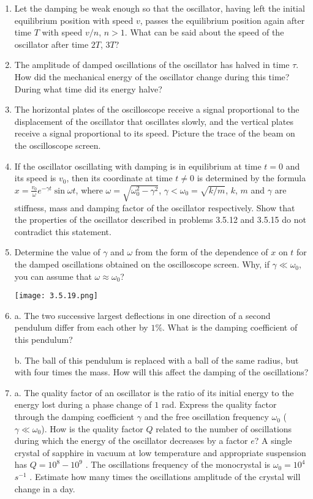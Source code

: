 \documentclass{article}
\begin{document}
\begin{enumerate}[label=3.5.\arabic*]
\item Let the damping be weak enough so that the oscillator, having left the initial equilibrium position with speed $v$, passes the equilibrium position again after time $T$ with speed $v/n$, $n > 1$. What can be said about the speed of the oscillator after time $2 T$, $3 T$?

\item The amplitude of damped oscillations of the oscillator has halved in time $\tau$. How did the mechanical energy of the oscillator change during this time? During what time did its energy halve?

\item The horizontal plates of the oscilloscope receive a signal proportional to the displacement of the oscillator that oscillates slowly, and the vertical plates receive a signal proportional to its speed. Picture the trace of the beam on the oscilloscope screen.

\item If the oscillator oscillating with damping is in equilibrium at time $t = 0$ and its speed is $v_0$, then its coordinate at time $t \neq 0$ is determined by the formula $x = \frac{v_0}{\omega} e^{- \gamma t} \sin{\omega t}$, where $\omega = \sqrt{\omega_0^2 - \gamma^2}$, $\gamma < \omega_0 = \sqrt{k/m}$, $k$, $m$ and $\gamma$ are stiffness, mass and damping factor of the oscillator respectively. Show that the properties of the oscillator described in problems 3.5.12 and 3.5.15 do not contradict this statement.

\item Determine the value of $\gamma$ and $\omega$ from the form of the dependence of $x$ on $t$ for the damped oscillations obtained on the oscilloscope screen. Why, if $\gamma \ll \omega_0$, you can assume that $\omega \approx \omega_0$?

\begin{center}
    \texttt{[image: 3.5.19.png]}
\end{center}

\item a. The two successive largest deflections in one direction of a second pendulum differ from each other by $1\%$. What is the damping coefficient of this pendulum?

b. The ball of this pendulum is replaced with a ball of the same radius, but with four times the mass. How will this affect the damping of the oscillations?

\item a. The quality factor of an oscillator is the ratio of its initial energy to the energy lost during a phase change of $1$ rad. Express the quality factor through the damping coefficient $\gamma$ and the free oscillation frequency $\omega_0$ ($\gamma \ll \omega_0$). How is the quality factor $Q$ related to the number of oscillations during which the energy of the oscillator decreases by a factor $e$? A single crystal of sapphire in vacuum at low temperature and appropriate suspension has $Q = 10^8 - 10^9$ . The oscillations frequency of the monocrystal is $\omega_0 = 10^4$ $s^{-1}$ . Estimate how many times the oscillations amplitude of the crystal will change in a day.


\end{enumerate}
\end{document}
